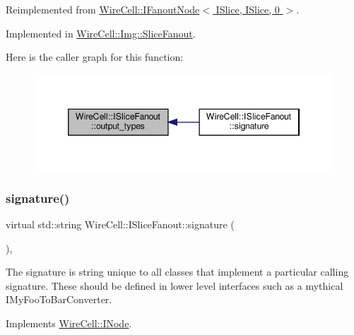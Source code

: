 Reimplemented from \hyperlink{class_wire_cell_1_1_i_fanout_node_a2191dc9d44b35d6ff4bda5d5356c6ac5}{Wire\+Cell\+::\+I\+Fanout\+Node$<$ I\+Slice, I\+Slice, 0 $>$}.



Implemented in \hyperlink{class_wire_cell_1_1_img_1_1_slice_fanout_a98fe441e7e47306ff0352f547e9b9066}{Wire\+Cell\+::\+Img\+::\+Slice\+Fanout}.

Here is the caller graph for this function\+:
\nopagebreak
\begin{figure}[H]
\begin{center}
\leavevmode
\includegraphics[width=346pt]{class_wire_cell_1_1_i_slice_fanout_abde53bdfe0cef64ba3b05edcf111db65_icgraph}
\end{center}
\end{figure}
\mbox{\label{class_wire_cell_1_1_i_slice_fanout_a7f2b90a58e2be888e25625e322f14c8d}} 
\subsubsection{\texorpdfstring{signature()}{signature()}}
{\footnotesize\ttfamily virtual std\+::string Wire\+Cell\+::\+I\+Slice\+Fanout\+::signature (\begin{DoxyParamCaption}{ }\end{DoxyParamCaption})\hspace{0.3cm}{\ttfamily [inline]}, {\ttfamily [virtual]}}

The signature is string unique to all classes that implement a particular calling signature. These should be defined in lower level interfaces such as a mythical I\+My\+Foo\+To\+Bar\+Converter. 

Implements \hyperlink{class_wire_cell_1_1_i_node_a0b0763465adf5ba7febe8e378162b584}{Wire\+Cell\+::\+I\+Node}.



